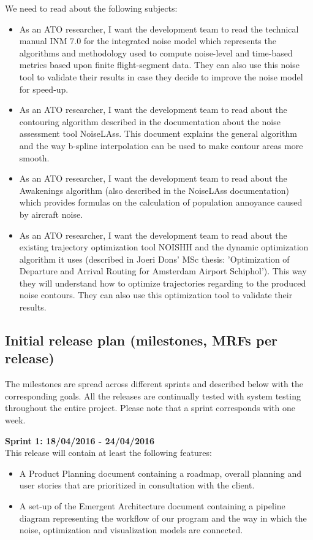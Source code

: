 \documentclass[a4paper,english,fleqn]{exam}
\begin{document}
We need to read about the following subjects:
\begin{itemize}
\item As an ATO researcher, I want the development team to read the technical manual INM 7.0 for the integrated noise model which represents the algorithms and methodology used to compute noise-level and time-based metrics based upon finite flight-segment data. They can also use this noise tool to validate their results in case they decide to improve the noise model for speed-up.
\item As an ATO researcher, I want the development team to read about the contouring algorithm described in the documentation about the noise assessment tool NoiseLAss. This document explains the general algorithm and the way b-spline interpolation can be used to make contour areas more smooth.
\item As an ATO researcher, I want the development team to read about the Awakenings algorithm (also described in the NoiseLAss documentation) which provides formulas on the calculation of population annoyance caused by aircraft noise.
\item As an ATO researcher, I want the development team to read about the existing trajectory optimization tool NOISHH and the dynamic optimization algorithm it uses (described in Joeri Dons' MSc thesis: 'Optimization of Departure and Arrival Routing for Amsterdam Airport Schiphol'). This way they will understand how to optimize trajectories regarding to the produced noise contours. They can also use this optimization tool to validate their results. 
\end{itemize}

\newpage 

\subsection{Initial release plan (milestones, MRFs per release)}
The milestones are spread across different sprints and described below with the corresponding goals. All the releases are continually tested with system testing throughout the entire project. Please note that a sprint corresponds with one week.

\textbf{Sprint 1: 18/04/2016 - 24/04/2016 } \\
This release will contain at least the following features:
\begin{itemize}
\item A Product Planning document containing a roadmap, overall planning and user stories that are prioritized in consultation with the client.
\item A set-up of the Emergent Architecture document containing a pipeline diagram representing the workflow of our program and the way in which the noise, optimization and visualization models are connected.

\end{itemize}
\end{document}
